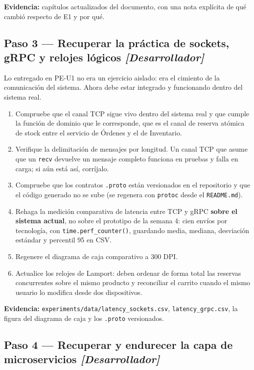 \documentclass[11pt,a4paper]{article}
\newcommand{\paso}[1]{\subsection{#1}}
\begin{document}
	\textbf{Evidencia:} capítulos actualizados del documento, con una nota explícita de qué cambió respecto de E1 y por qué.
	
	\paso{Paso 3 --- Recuperar la práctica de sockets, gRPC y relojes lógicos \emph{[Desarrollador]}}
	
	Lo entregado en PE-U1 no era un ejercicio aislado: era el cimiento de la comunicación del sistema. Ahora debe estar integrado y funcionando dentro del sistema real.
	
	\begin{enumerate}[leftmargin=*,itemsep=4pt]
		\item Compruebe que el canal TCP sigue vivo dentro del sistema real y que cumple la función de dominio que le corresponde, que es el canal de reserva atómica de stock entre el servicio de Órdenes y el de Inventario.
		\item Verifique la delimitación de mensajes por longitud. Un canal TCP que asume que un \texttt{recv} devuelve un mensaje completo funciona en pruebas y falla en carga; si aún está así, corríjalo.
		\item Compruebe que los contratos \texttt{.proto} están versionados en el repositorio y que el código generado no se sube (se regenera con \texttt{protoc} desde el \texttt{README.md}).
		\item Rehaga la medición comparativa de latencia entre TCP y gRPC \textbf{sobre el sistema actual}, no sobre el prototipo de la semana 4: cien envíos por tecnología, con \texttt{time.perf\_counter()}, guardando media, mediana, desviación estándar y percentil 95 en CSV.
		\item Regenere el diagrama de caja comparativo a 300 DPI.
		\item Actualice los relojes de Lamport: deben ordenar de forma total las reservas concurrentes sobre el mismo producto y reconciliar el carrito cuando el mismo usuario lo modifica desde dos dispositivos.
	\end{enumerate}
	
	\textbf{Evidencia:} \texttt{experiments/data/latency\_sockets.csv}, \texttt{latency\_grpc.csv}, la figura del diagrama de caja y los \texttt{.proto} versionados.
	
	\paso{Paso 4 --- Recuperar y endurecer la capa de microservicios \emph{[Desarrollador]}}
	
\end{document}
